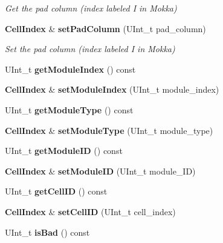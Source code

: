 \begin{DoxyCompactItemize}
\begin{DoxyCompactList}\small\item\em Get the pad column (index labeled I in Mokka) \end{DoxyCompactList}\item 
{\bf Cell\-Index} \& {\bf set\-Pad\-Column} (U\-Int\-\_\-t pad\-\_\-column)\label{classCALICE_1_1CellIndex_aa5e1d6c7bf39e5bfbf5ab414405b36d2}

\begin{DoxyCompactList}\small\item\em Set the pad column (index labeled I in Mokka) \end{DoxyCompactList}\item 
U\-Int\-\_\-t {\bfseries get\-Module\-Index} () const \label{classCALICE_1_1CellIndex_ad7c3aed04f51baa6a532e2dc18c0b985}

\item 
{\bf Cell\-Index} \& {\bfseries set\-Module\-Index} (U\-Int\-\_\-t module\-\_\-index)\label{classCALICE_1_1CellIndex_a87812ed0af0e2c688b21af5a7b3f53fd}

\item 
U\-Int\-\_\-t {\bfseries get\-Module\-Type} () const \label{classCALICE_1_1CellIndex_ada309da2021a56aa6bb61d0c503f2bd7}

\item 
{\bf Cell\-Index} \& {\bfseries set\-Module\-Type} (U\-Int\-\_\-t module\-\_\-type)\label{classCALICE_1_1CellIndex_aa7541e4208eb9cd7bb5401b324f539e1}

\item 
U\-Int\-\_\-t {\bfseries get\-Module\-I\-D} () const \label{classCALICE_1_1CellIndex_a77cabe65a4bd5887963f70eacef6a1b9}

\item 
{\bf Cell\-Index} \& {\bfseries set\-Module\-I\-D} (U\-Int\-\_\-t module\-\_\-\-I\-D)\label{classCALICE_1_1CellIndex_a5cfc410ec22f397a8c21c878e53ab311}

\item 
U\-Int\-\_\-t {\bfseries get\-Cell\-I\-D} () const \label{classCALICE_1_1CellIndex_a8754c16be2ec04e51661f388ff994ebf}

\item 
{\bf Cell\-Index} \& {\bfseries set\-Cell\-I\-D} (U\-Int\-\_\-t cell\-\_\-index)\label{classCALICE_1_1CellIndex_a3ecc39a5eb6b4c2d1319d113e1d8b6c3}

\item 
U\-Int\-\_\-t {\bfseries is\-Bad} () const \label{classCALICE_1_1CellIndex_a33d6d5bfcc91c6653139a73b5c6ff207}


\end{DoxyCompactItemize}
